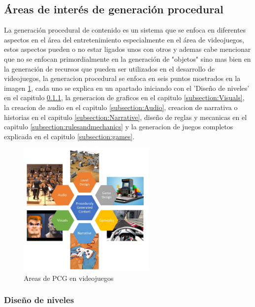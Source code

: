 \subsection{Áreas de interés de generación procedural}
\label{subsection:PCGAreasOfInterest}

La generación procedural de contenido es un sistema que se enfoca en diferentes
aspectos en el área del entretenimiento especialmente en el área de videojuegos,
estos aspectos pueden o no estar ligados unos con otros y ademas cabe mencionar
que no se enfocan primordialmente en la generación de "objetos" sino mas bien en
la generación de recursos que pueden ser utilizados en el desarrollo de
videojuegos, la generacion procedural se enfoca en seis puntos mostrados en la
imagen \ref{figure:pcg_areas}, cada uno se explica en un apartado iniciando con
el 'Diseño de niveles' en el capitulo \ref{subsection:LevelDesign}, la
generacion de graficos en el capitulo \ref{subsection:Visuals}, la creacion de
audio en el capitulo \ref{subsection:Audio}, creacion de narrativa o historias
en el capitulo \ref{subsection:Narrative}, diseño de reglas y mecanicas en el
capitulo \ref{subsection:rulesandmechanics} y la generacion de juegos completos
explicada en el capitulo \ref{subsection:games}.

\begin{figure}
    \centering
    \includegraphics[width=0.6\textwidth]{img/pcg_areas.png}
    \caption{Areas de PCG en videojuegos}
    \label{figure:pcg_areas}
\end{figure}

\subsubsection{Diseño de niveles}
\label{subsection:LevelDesign}

